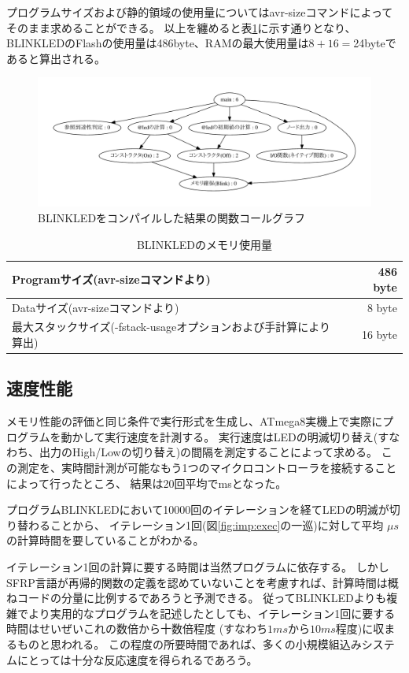 プログラムサイズおよび静的領域の使用量についてはavr-sizeコマンドによってそのまま求めることができる。
以上を纏めると表\ref{fig:imp:size}に示す通りとなり、
BLINKLEDのFlashの使用量は486byte、RAMの最大使用量は$8+16=$24byteであると算出される。

\begin{figure}[h]
 \begin{center}
  \includegraphics[width=160mm]{figure/call_graph.pdf}
 \end{center}
 \caption{BLINKLEDをコンパイルした結果の関数コールグラフ}
 \label{fig:imp:call_graph}
\end{figure}

\begin{table}[h]
  \centering
  \begin{tabular}{l|r}
    Programサイズ(avr-sizeコマンドより) & 486 byte \\ \hline
    Dataサイズ(avr-sizeコマンドより) & 8 byte \\ \hline
    最大スタックサイズ(-fstack-usageオプションおよび手計算により算出)  & 16 byte \\ \hline
  \end{tabular}
\caption{BLINKLEDのメモリ使用量}
\label{fig:imp:size}
\end{table}


\subsection{速度性能}\label{sec:implementation:performance:speed}
メモリ性能の評価と同じ条件で実行形式を生成し、ATmega8実機上で実際にプログラムを動かして実行速度を計測する。
実行速度はLEDの明滅切り替え(すなわち、出力のHigh/Lowの切り替え)の間隔を測定することによって求める。
この測定を、実時間計測が可能なもう1つのマイクロコントローラを接続することによって行ったところ、
結果は20回平均でmsとなった。

プログラムBLINKLEDにおいて10000回のイテレーションを経てLEDの明滅が切り替わることから、
イテレーション1回(図\ref{fig:imp:exec}の一巡)に対して平均
$  \mu s$
の計算時間を要していることがわかる。

イテレーション1回の計算に要する時間は当然プログラムに依存する。
しかしSFRP言語が再帰的関数の定義を認めていないことを考慮すれば、計算時間は概ねコードの分量に比例するであろうと予測できる。
従ってBLINKLEDよりも複雑でより実用的なプログラムを記述したとしても、イテレーション1回に要する時間はせいぜいこれの数倍から十数倍程度
(すなわち$1ms$から$10ms$程度)に収まるものと思われる。
この程度の所要時間であれば、多くの小規模組込みシステムにとっては十分な反応速度を得られるであろう。
